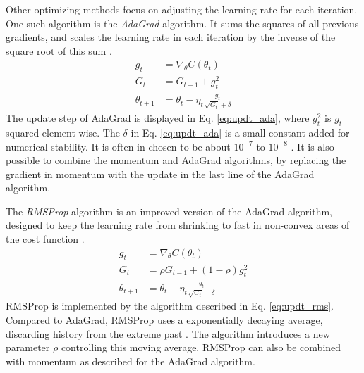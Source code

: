 Other optimizing methods focus on adjusting the learning rate for each iteration. One such algorithm is the \textit{AdaGrad} algorithm.
It sums the squares of all previous gradients, and scales the learning rate in each iteration by the inverse of the square root of this sum \citep[p. 303]{Goodfellow-et-al-2016}.
\begin{equation}\label{eq:updt_ada}
\begin{split}
    g_t &= \nabla_{\theta}C(\theta_t)   \\
    G_t &= G_{t-1} + {g}_t^2          \\
    \theta_{t+1} &= \theta_t - \eta_t \frac{g_t}{\sqrt{G_t} + \delta}
\end{split}
\end{equation}
The update step of AdaGrad is displayed in Eq. \ref{eq:updt_ada}, where $g_t^2$ is $g_t$ squared element-wise.
The $\delta$ in Eq. \ref{eq:updt_ada} is a small constant added for numerical stability.
It is often in chosen to be about $10^{-7}$ to $10^{-8}$ \citep[p. 304]{Goodfellow-et-al-2016}.
It is also possible to combine the momentum and AdaGrad algorithms, by replacing the gradient in momentum with the update in the last line of the AdaGrad algorithm.

The \textit{RMSProp} algorithm is an improved version of the AdaGrad algorithm, designed to keep the learning rate from shrinking to fast in non-convex areas of the cost function \citep[p. 122]{Ketkar2017}.
\begin{equation}\label{eq:updt_rms}
\begin{split}
    g_t &= \nabla_{\theta}C(\theta_t)   \\
    G_t &= \rho G_{t-1} + (1-\rho)g_t^2              \\
    \theta_{t+1} &= \theta_t - \eta_t \frac{g_t}{\sqrt{G_t} + \delta}
\end{split}
\end{equation}
RMSProp is implemented by the algorithm described in Eq. \ref{eq:updt_rms}.
Compared to AdaGrad, RMSProp uses a exponentially decaying average, discarding history from the extreme past \citep[p. 304]{Goodfellow-et-al-2016}.
The algorithm introduces a new parameter $\rho$ controlling this moving average.
RMSProp can also be combined with momentum as described for the AdaGrad algorithm.

